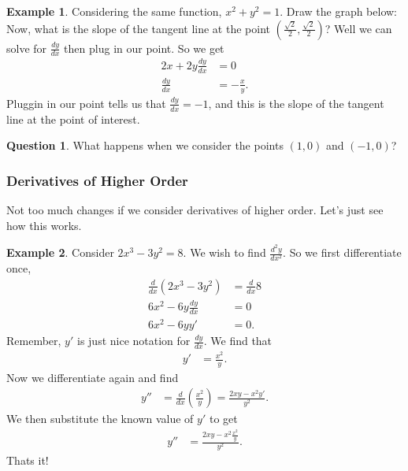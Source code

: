 \documentclass[leqno]{article}
\theoremstyle{definition}
\newtheorem{example}{Example}[section]
\newtheorem{question}{Question}[section]
\theoremstyle{remark}
\theoremstyle{theorem}
\begin{document}
\begin{example}
Considering the same function, $x^2+y^2=1$. Draw the graph below:
\vspace*{5cm}\\

Now, what is the slope of the tangent line at the point $\left(\frac{\sqrt{2}}{2},\frac{\sqrt{2}}{2}\right)$? Well we can solve for $\frac{dy}{dx}$ then plug in our point.  So we get
\begin{align*}
2x+2y\frac{dy}{dx}&=0\\
\frac{dy}{dx}&=-\frac{x}{y}.
\end{align*}
Pluggin in our point tells us that $\frac{dy}{dx}=-1$, and this is the slope of the tangent line at the point of interest.  
\end{example}

\begin{question}
What happens when we consider the points $(1,0)$ and $(-1,0)$?
\vspace*{3cm}\\
\end{question}

\subsubsection{Derivatives of Higher Order}

Not too much changes if we consider derivatives of higher order. Let's just see how this works.

\begin{example}
Consider $2x^3-3y^2=8$. We wish to find $\frac{d^2 y}{dx^2}$.  So we first differentiate once,
\begin{align*}
\frac{d}{dx}(2x^3-3y^2)&=\frac{d}{dx}8\\
6x^2-6y\frac{dy}{dx}&=0\\
6x^2-6yy'&=0.
\end{align*}
Remember, $y'$ is just nice notation for $\frac{dy}{dx}$. We find that 
\begin{align*}
y'&=\frac{x^2}{y}.
\end{align*}
Now we differentiate again and find
\begin{align*}
y''&=\frac{d}{dx}\left( \frac{x^2}{y}\right) = \frac{2xy-x^2y'}{y^2}.
\end{align*}
We then substitute the known value of $y'$ to get
\begin{align*}
y''&=\frac{2xy-x^2\frac{x^2}{y}}{y^2}.
\end{align*}
Thats it!
\end{example}
\end{document}

